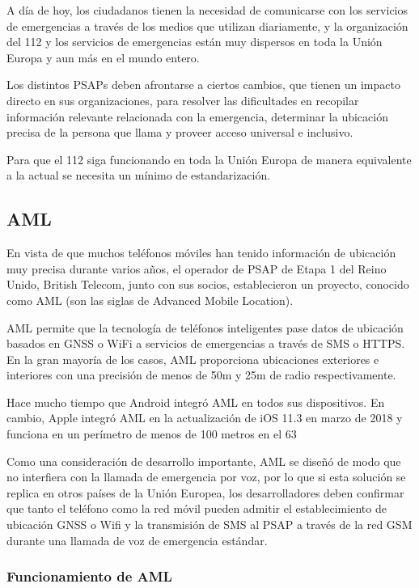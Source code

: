 A día de hoy, los ciudadanos tienen la necesidad de comunicarse con los servicios de emergencias a través de los medios que utilizan diariamente, y la organización del 112 y los servicios de emergencias están muy dispersos en toda la Unión Europa y aun más en el mundo entero.

Los distintos PSAPs deben afrontarse a ciertos cambios, que tienen un impacto directo en sus organizaciones, para resolver las dificultades en recopilar información relevante relacionada con la emergencia, determinar la ubicación precisa de la persona que llama y proveer acceso universal e inclusivo.

Para que el 112 siga funcionando en toda la Unión Europa de manera equivalente a la actual se necesita un mínimo de estandarización.

\subsection{AML}

En vista de que muchos teléfonos móviles han tenido información de ubicación muy precisa durante varios años, el operador de PSAP de Etapa 1 del Reino Unido, British Telecom, junto con sus socios, establecieron un proyecto, conocido como AML (son las siglas de Advanced Mobile Location).

AML permite que la tecnología de teléfonos inteligentes pase datos de ubicación basados en GNSS o WiFi a servicios de emergencias a través de SMS o HTTPS. En la gran mayoría de los casos, AML proporciona ubicaciones exteriores e interiores con una precisión de menos de 50m y 25m de radio respectivamente.

Hace mucho tiempo que Android integró AML en todos sus dispositivos. En cambio, Apple integró AML en la actualización de iOS 11.3 en marzo de 2018 y funciona en un perímetro de menos de 100 metros en el 63%

Como una consideración de desarrollo importante, AML se diseñó de modo que no interfiera con la llamada de emergencia por voz, por lo que si esta solución se replica en otros países de la Unión Europea, los desarrolladores deben confirmar que tanto el teléfono como la red móvil pueden admitir el establecimiento de ubicación GNSS o Wifi y la transmisión de SMS al PSAP a través de la red GSM durante una llamada de voz de emergencia estándar.

\subsubsection{Funcionamiento de AML}


